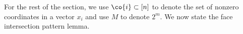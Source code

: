 \documentclass[10pt,a4paper]{article}
\theoremstyle{definition}
\theoremstyle{remark}
\newtheorem{claim}[theorem]{Claim}
\newcommand\sett[2]{\left\{ #1 \left| \; \vphantom{#1 #2} \right. #2  \right\}}
\numberwithin{equation}{section}
\begin{document}


For the rest of the section, we use $\co{i}\subset [n]$ to denote the set of nonzero coordinates in a vector $x_i$ and use $M$ to denote \(2^m\). We now state the face intersection pattern lemma.
%

\end{document}
